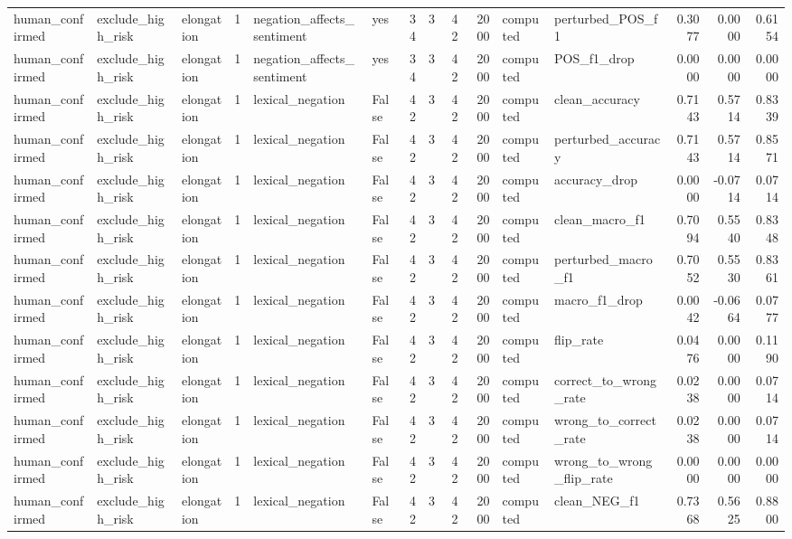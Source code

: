 \begin{tabular}{lllrllrrrrllrrr}
human_confirmed & exclude_high_risk & elongation & 1 & negation_affects_sentiment & yes & 34 & 3 & 42 & 2000 & computed & perturbed_POS_f1 & 0.3077 & 0.0000 & 0.6154 \\
human_confirmed & exclude_high_risk & elongation & 1 & negation_affects_sentiment & yes & 34 & 3 & 42 & 2000 & computed & POS_f1_drop & 0.0000 & 0.0000 & 0.0000 \\
human_confirmed & exclude_high_risk & elongation & 1 & lexical_negation & False & 42 & 3 & 42 & 2000 & computed & clean_accuracy & 0.7143 & 0.5714 & 0.8339 \\
human_confirmed & exclude_high_risk & elongation & 1 & lexical_negation & False & 42 & 3 & 42 & 2000 & computed & perturbed_accuracy & 0.7143 & 0.5714 & 0.8571 \\
human_confirmed & exclude_high_risk & elongation & 1 & lexical_negation & False & 42 & 3 & 42 & 2000 & computed & accuracy_drop & 0.0000 & -0.0714 & 0.0714 \\
human_confirmed & exclude_high_risk & elongation & 1 & lexical_negation & False & 42 & 3 & 42 & 2000 & computed & clean_macro_f1 & 0.7094 & 0.5540 & 0.8348 \\
human_confirmed & exclude_high_risk & elongation & 1 & lexical_negation & False & 42 & 3 & 42 & 2000 & computed & perturbed_macro_f1 & 0.7052 & 0.5530 & 0.8361 \\
human_confirmed & exclude_high_risk & elongation & 1 & lexical_negation & False & 42 & 3 & 42 & 2000 & computed & macro_f1_drop & 0.0042 & -0.0664 & 0.0777 \\
human_confirmed & exclude_high_risk & elongation & 1 & lexical_negation & False & 42 & 3 & 42 & 2000 & computed & flip_rate & 0.0476 & 0.0000 & 0.1190 \\
human_confirmed & exclude_high_risk & elongation & 1 & lexical_negation & False & 42 & 3 & 42 & 2000 & computed & correct_to_wrong_rate & 0.0238 & 0.0000 & 0.0714 \\
human_confirmed & exclude_high_risk & elongation & 1 & lexical_negation & False & 42 & 3 & 42 & 2000 & computed & wrong_to_correct_rate & 0.0238 & 0.0000 & 0.0714 \\
human_confirmed & exclude_high_risk & elongation & 1 & lexical_negation & False & 42 & 3 & 42 & 2000 & computed & wrong_to_wrong_flip_rate & 0.0000 & 0.0000 & 0.0000 \\
human_confirmed & exclude_high_risk & elongation & 1 & lexical_negation & False & 42 & 3 & 42 & 2000 & computed & clean_NEG_f1 & 0.7368 & 0.5625 & 0.8800 \\

\end{tabular}
